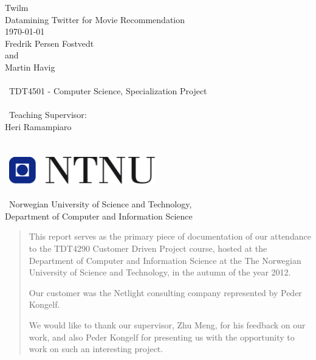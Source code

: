 \documentclass[10pt,a4paper,oneside]{report}
\begin{document}
\thispagestyle{empty}
\begin{center}
	{\Huge Twilm} \\
	\medskip
	{\LARGE Datamining Twitter for Movie Recommendation} \\
    {\large \today \\Fredrik Persen Fostvedt \\ and \\ Martin Havig}
    {\Large \\\ \\\ TDT4501 - Computer Science, Specialization Project}
    {\large \\\ \\\ Teaching Supervisor: \\ Heri Ramampiaro} \\\ \\\ \\\
    \includegraphics[width=2.5in]{image/logo_NTNU.png} \\\ \\\
    {\Large Norwegian University of Science and Technology, \\
    Department of Computer and Information Science} \\
\end{center}
\newpage

\renewcommand{\abstractname}{Acknowledgments}
\begin{abstract}

This report serves as the primary piece of documentation of our attendance to the TDT4290 Customer Driven Project course, hosted at the Department of Computer and Information Science at the The Norwegian University of Science and Technology, in the autumn of the year 2012.

Our customer was the Netlight consulting company represented by Peder Kongelf.

We would like to thank our supervisor, Zhu Meng, for his feedback on our work, and also Peder Kongelf for presenting us with the opportunity to work on such an interesting project.

\end{abstract}
\end{document}
